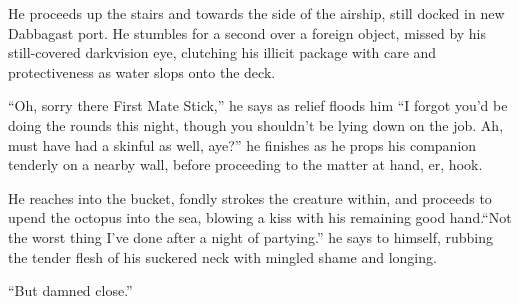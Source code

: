 He proceeds up the stairs and towards the side of the airship, still docked in new Dabbagast port. He stumbles for a second over a foreign object, missed by his still-covered darkvision eye, clutching his illicit package with care and protectiveness as water slops onto the deck.\medskip

“Oh, sorry there First Mate Stick,” he says as relief floods him “I forgot you’d be doing the rounds this night, though you shouldn’t be lying down on the job. Ah, must have had a skinful as well, aye?” he finishes as he props his companion tenderly on a nearby wall, before proceeding to the matter at hand, er, hook.\medskip

He reaches into the bucket, fondly strokes the creature within, and proceeds to upend the octopus into the sea, blowing a kiss with his remaining good hand.“Not the worst thing I’ve done after a night of partying.” he says to himself, rubbing the tender flesh of his suckered neck with mingled shame and longing.\medskip

“But damned close.”\medskip

\vspace*{5mm}

